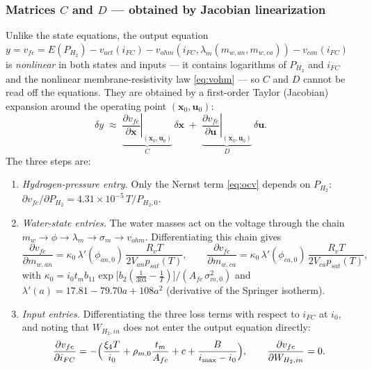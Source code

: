 \subsubsection*{Matrices $C$ and $D$ --- obtained by Jacobian linearization}
Unlike the state equations, the output equation
$y = v_{fc} = E(P_{H_2}) - v_{act}(i_{FC}) - v_{ohm}(i_{FC},\lambda_m(m_{w,an},m_{w,ca})) - v_{con}(i_{FC})$
is \emph{nonlinear} in both states and inputs --- it contains logarithms of
$P_{H_2}$ and $i_{FC}$ and the nonlinear membrane-resistivity law
\eqref{eq:vohm} --- so $C$ and $D$ cannot be read off the equations. They are
obtained by a first-order Taylor (Jacobian) expansion around the operating point
$(\mathbf{x}_0,\mathbf{u}_0)$:
\begin{equation*}
    \delta y \;\approx\;
    \underbrace{\left.\frac{\partial v_{fc}}{\partial \mathbf{x}}\right|_{(\mathbf{x}_0,\mathbf{u}_0)}}_{C}\,
    \delta\mathbf{x}
    \;+\;
    \underbrace{\left.\frac{\partial v_{fc}}{\partial \mathbf{u}}\right|_{(\mathbf{x}_0,\mathbf{u}_0)}}_{D}\,
    \delta\mathbf{u}.
\end{equation*}
The three steps are:
\begin{enumerate}[label=\arabic*)]
    \item \emph{Hydrogen-pressure entry.} Only the Nernst term \eqref{eq:ocv}
          depends on $P_{H_2}$:
          $\partial v_{fc}/\partial P_{H_2}
           = 4.31\times10^{-5}\,T/P_{H_2,0}$.
    \item \emph{Water-state entries.} The water masses act on the voltage through
          the chain
          $m_{w}\rightarrow \phi \rightarrow \lambda_m \rightarrow \sigma_m
           \rightarrow v_{ohm}$. Differentiating this chain gives
          \begin{equation*}
              \frac{\partial v_{fc}}{\partial m_{w,an}}
              = \kappa_0\,\lambda'(\phi_{an,0})\,\frac{R_v T}{2V_{an}p_{sat}(T)},
              \qquad
              \frac{\partial v_{fc}}{\partial m_{w,ca}}
              = \kappa_0\,\lambda'(\phi_{ca,0})\,\frac{R_v T}{2V_{ca}p_{sat}(T)},
          \end{equation*}
          with
          $\kappa_0 = i_0 t_m b_{11}
           \exp\bigl[b_2(\tfrac{1}{303}-\tfrac{1}{T})\bigr]/(A_{fc}\,\sigma_{m,0}^{2})$
          and $\lambda'(a)=17.81-79.70a+108a^2$ (derivative of the Springer
          isotherm).
    \item \emph{Input entries.} Differentiating the three loss terms with respect
          to $i_{FC}$ at $i_0$, and noting that $W_{H_2,in}$ does not enter the
          output equation directly:
          \begin{equation*}
              \frac{\partial v_{fc}}{\partial i_{FC}}
              = -\Bigl(\frac{\xi_4 T}{i_0}
                + \rho_{m,0}\frac{t_m}{A_{fc}} + c
                + \frac{B}{i_{\max}-i_0}\Bigr),
              \qquad
              \frac{\partial v_{fc}}{\partial W_{H_2,in}} = 0.
          \end{equation*}
\end{enumerate}
